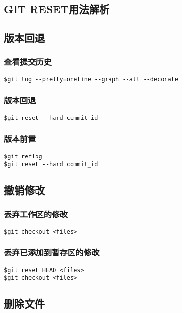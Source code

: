 \subsection{\textbf{GIT RESET用法解析}}

\subsection{版本回退}
\subsubsection{查看提交历史}
\begin{lstlisting}
$git log --pretty=oneline --graph --all --decorate
\end{lstlisting}

\subsubsection{版本回退}
\begin{lstlisting}
$git reset --hard commit_id
\end{lstlisting}

\subsubsection{版本前置}
\begin{lstlisting}
$git reflog
$git reset --hard commit_id
\end{lstlisting}

\subsection{撤销修改}
\subsubsection{丢弃工作区的修改}
\begin{lstlisting}
$git checkout <files>
\end{lstlisting}

\subsubsection{丢弃已添加到暂存区的修改}
\begin{lstlisting}
$git reset HEAD <files>
$git checkout <files>
\end{lstlisting}

\subsection{删除文件}
